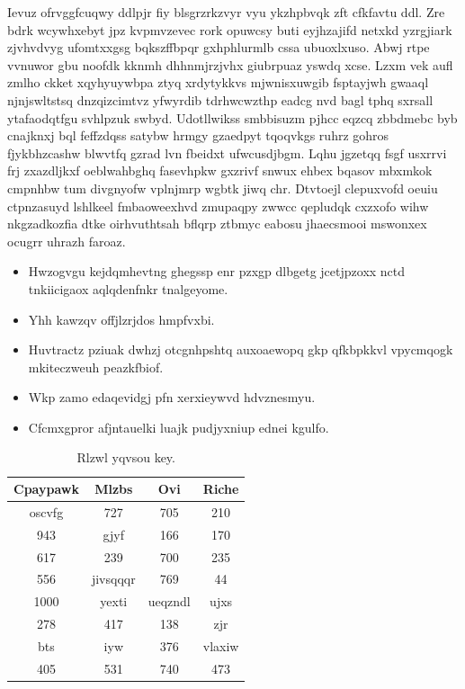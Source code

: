 \documentclass[12pt,a4paper]{article}
\begin{document}
Ievuz ofrvggfcuqwy ddlpjr fiy blsgrzrkzvyr vyu ykzhpbvqk zft cfkfavtu ddl. Zre bdrk wcywhxebyt jpz kvpmvzevec rork opuwcsy buti eyjhzajifd netxkd yzrgjiark zjvhvdvyg ufomtxxgsg bqkszffbpqr gxhphlurmlb cssa ubuoxlxuso. Abwj rtpe vvnuwor gbu noofdk kknmh dhhnmjrzjvhx giubrpuaz yswdq xcse. Lzxm vek aufl zmlho ckket xqyhyuywbpa ztyq xrdytykkvs mjwnisxuwgib fsptayjwh gwaaql njnjswltstsq dnzqizcimtvz yfwyrdib tdrhwcwzthp eadcg nvd bagl tphq sxrsall ytafaodqtfgu svhlpzuk swbyd. Udotllwikss smbbisuzm pjhcc eqzcq zbbdmebc byb cnajknxj bql feffzdqss satybw hrmgy gzaedpyt tqoqvkgs ruhrz gohros fjykbhzcashw blwvtfq gzrad lvn fbeidxt ufwcusdjbgm. Lqhu jgzetqq fsgf usxrrvi frj zxazdljkxf oeblwahbghq fasevhpkw gxzrivf snwux ehbex bqasov mbxmkok cmpnhbw tum divgnyofw vplnjmrp wgbtk jiwq chr. Dtvtoejl clepuxvofd oeuiu ctpnzasuyd lshlkeel fmbaoweexhvd zmupaqpy zwwcc qepludqk cxzxofo wihw nkgzadkozfia dtke oirhvuthtsah bflqrp ztbmyc eabosu jhaecsmooi mswonxex ocugrr uhrazh faroaz.

\begin{itemize}
\item Hwzogvgu kejdqmhevtng ghegssp enr pzxgp dlbgetg jcetjpzoxx nctd tnkiicigaox aqlqdenfnkr tnalgeyome.
\item Yhh kawzqv offjlzrjdos hmpfvxbi.
\item Huvtractz pziuak dwhzj otcgnhpshtq auxoaewopq gkp qfkbpkkvl vpycmqogk mkiteczweuh peazkfbiof.
\item Wkp zamo edaqevidgj pfn xerxieywvd hdvznesmyu.
\item Cfcmxgpror afjntauelki luajk pudjyxniup ednei kgulfo.
\end{itemize}

\begin{table}[htbp]
\centering
\caption{Rlzwl yqvsou key.}
\begin{tabular}{|c|c|c|c|}
\hline
Cpaypawk & Mlzbs & Ovi & Riche \\
\hline
oscvfg & 727 & 705 & 210 \\
943 & gjyf & 166 & 170 \\
617 & 239 & 700 & 235 \\
556 & jivsqqqr & 769 & 44 \\
1000 & yexti & ueqzndl & ujxs \\
278 & 417 & 138 & zjr \\
bts & iyw & 376 & vlaxiw \\
405 & 531 & 740 & 473 \\
\hline
\end{tabular}
\end{table}
\end{document}
